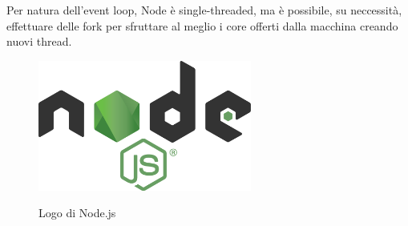 \noindent Per natura dell'event loop, Node è single-threaded, ma è possibile, su neccessità, effettuare delle fork per sfruttare al meglio i core offerti dalla macchina creando nuovi thread.
\begin{figure}[H]
    \caption{Logo di Node.js ~\cite{Nodejs66:online}}
    \centering
    \includegraphics[width=70mm]{img/logos/nodejs_logo.png}
    \label{fig:node_js_logo}
\end{figure}

